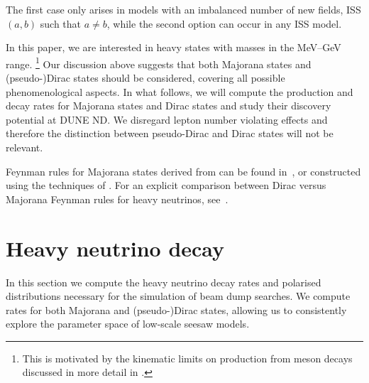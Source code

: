 	The first case only arises in models with an imbalanced number of new fields, %
	\ie ISS\,$(a,b)$ such that $a\neq b$, while the second option can occur in any ISS model. 

In this paper, we are interested in heavy states with masses in the MeV--GeV range.%
\footnote{This is motivated by the kinematic limits on production from meson decays discussed in more detail in .} %
Our discussion above suggests that both Majorana states and (pseudo-)Dirac states should be considered, %
covering all possible phenomenological aspects.
In what follows, we will compute the production and decay rates for Majorana states %
and Dirac states and study their discovery potential at DUNE ND.
We disregard lepton number violating effects and therefore the distinction between pseudo-Dirac and Dirac states will not be relevant.

Feynman rules for Majorana states derived from  can be found in~\cite{Atre:2009rg},
or constructed using the techniques of . 
For an explicit comparison between Dirac versus Majorana Feynman rules for heavy neutrinos, see~.



\section{Heavy neutrino decay}
\label{sec:decay}

In this section we compute the heavy neutrino decay rates and polarised %
distributions necessary for the simulation of beam dump searches.
We compute rates for both Majorana and (pseudo-)Dirac states, allowing us to consistently %
explore the parameter space of low-scale seesaw models.
%

